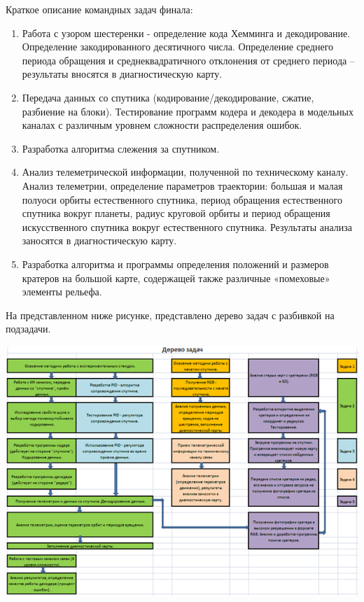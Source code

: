 Краткое описание командных задач финала:
\begin{enumerate}
\item Работа с узором шестеренки - определение кода Хемминга и декодирование. Определение закодированного десятичного числа. Определение среднего периода обращения и среднеквадратичного отклонения от среднего периода – результаты вносятся в диагностическую карту.
\item Передача данных со спутника (кодирование/декодирование, сжатие, разбиение на блоки). Тестирование программ кодера и декодера в модельных каналах с различным уровнем сложности распределения ошибок.
\item Разработка алгоритма слежения за спутником.
\item Анализ телеметрической информации, полученной по техническому каналу.  Анализ телеметрии, определение параметров траектории: большая и малая полуоси орбиты естественного спутника, период обращения естественного спутника вокруг планеты, радиус круговой орбиты и период обращения искусственного спутника вокруг естественного спутника. Результаты анализа заносятся в диагностическую карту.
\item Разработка алгоритма и программы определения положений и размеров кратеров на большой карте, содержащей также различные «помеховые» элементы рельефа.
\end{enumerate}

На представленном ниже рисунке, представлено дерево задач с разбивкой на подзадачи.

\includegraphics[width=15cm]{history/telecom/telecom.png}


